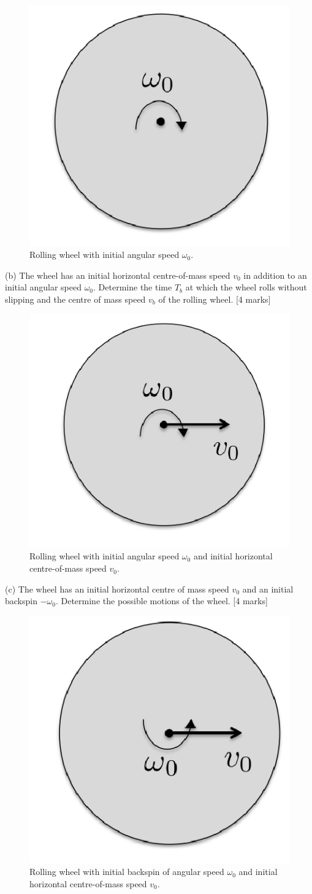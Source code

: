 \documentclass{article}
\begin{document}
\begin{figure}
	\centering
	\includegraphics[width=0.5\linewidth]{spho_book_TYS_images/2016q2.png}
	\caption{Rolling wheel with initial angular speed $\omega_0$.}
\end{figure}

(b) The wheel has an initial horizontal centre-of-mass speed $v_{0}$ in addition to an initial angular speed $\omega_{0}$. Determine the time $T_{b}$ at which the wheel rolls without slipping and the centre of mass speed $v_{b}$ of the rolling wheel. [4 marks] 
\begin{figure}
	\centering
	\includegraphics[width=0.5\linewidth]{spho_book_TYS_images/2016q2_2.png}
	\caption{Rolling wheel with initial angular speed $\omega_{0}$ and initial horizontal centre-of-mass speed $v_{0}$.}
\end{figure}

(c) The wheel has an initial horizontal centre of mass speed $v_{0}$ and an initial backspin $-\omega_{0}$. Determine the possible motions of the wheel. [4 marks]
\begin{figure}
	\includegraphics[width=0.5\linewidth]{spho_book_TYS_images/2016q2_3.png}
	\caption{Rolling wheel with initial backspin of angular speed $\omega_{0}$ and initial horizontal centre-of-mass speed $v_{0}$.}
\end{figure}
\end{document}
